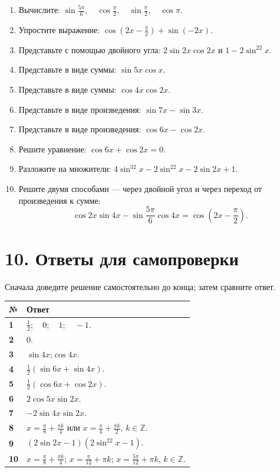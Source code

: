 \documentclass[a4paper,12pt]{article}
\newcommand{\heading}[1]{\section*{\color{darkaccent}#1}}
\begin{document}
\begin{enumerate}[label=\textbf{\arabic*.},itemsep=7mm]
\item Вычислите:
$\displaystyle \sin\frac{5\pi}{6},\quad \cos\frac\pi2,\quad \sin\frac\pi2,\quad\cos\pi.$

\item Упростите выражение:
$\displaystyle \cos\left(2x-\frac\pi2\right)+\sin(-2x).$

\item Представьте с помощью двойного угла:
$\displaystyle 2\sin2x\cos2x$ и $\displaystyle 1-2\sin^22x$.

\item Представьте в виде суммы:
$\displaystyle \sin5x\cos x.$

\item Представьте в виде суммы:
$\displaystyle \cos4x\cos2x.$

\item Представьте в виде произведения:
$\displaystyle \sin7x-\sin3x.$

\item Представьте в виде произведения:
$\displaystyle \cos6x-\cos2x.$

\item Решите уравнение:
$\displaystyle \cos6x+\cos2x=0.$

\item Разложите на множители:
$\displaystyle 4\sin^32x-2\sin^22x-2\sin2x+1.$

\item Решите двумя способами --- через двойной угол и через переход от произведения к сумме:
\[
\cos2x\sin4x-\sin\frac{5\pi}{6}\cos4x
=\cos\left(2x-\frac\pi2\right).
\]
\end{enumerate}

\clearpage
\heading{10. Ответы для самопроверки}
Сначала доведите решение самостоятельно до конца; затем сравните ответ.

\renewcommand{\arraystretch}{1.6}
\begin{tabularx}{\linewidth}{@{}>{\bfseries}p{11mm}X@{}}
\toprule
№ & Ответ \\
\midrule
1 & $\frac12;\quad 0;\quad 1;\quad -1$. \\
2 & $0$. \\
3 & $\sin4x$;\quad $\cos4x$. \\
4 & $\frac12(\sin6x+\sin4x)$. \\
5 & $\frac12(\cos6x+\cos2x)$. \\
6 & $2\cos5x\sin2x$. \\
7 & $-2\sin4x\sin2x$. \\
8 & $x=\frac\pi8+\frac{\pi k}{4}$ или $x=\frac\pi4+\frac{\pi k}{2}$, $k\in\mathbb Z$. \\
9 & $(2\sin2x-1)(2\sin^22x-1)$. \\
10 & $x=\frac\pi8+\frac{\pi k}{4}$; $x=\frac\pi{12}+\pi k$; $x=\frac{5\pi}{12}+\pi k$, $k\in\mathbb Z$. \\
\bottomrule
\end{tabularx}
\end{document}
